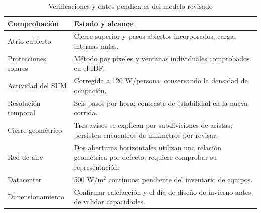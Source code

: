 \begin{table}[H]
\centering
\caption{Verificaciones y datos pendientes del modelo revisado}
\label{tab:db-verificacion}
{\small\singlespacing\renewcommand{\arraystretch}{1.10}
\begin{tabular}{p{3.7cm}p{9.3cm}}
\toprule
Comprobación & Estado y alcance \\
\midrule
Atrio cubierto & Cierre superior y pasos abiertos incorporados; cargas internas nulas. \\
Protecciones solares & Método por píxeles y ventanas individuales comprobados en el IDF. \\
Actividad del SUM & Corregida a 120 W/persona, conservando la densidad de ocupación. \\
Resolución temporal & Seis pasos por hora; contraste de estabilidad en la nueva corrida. \\
Cierre geométrico & Tres avisos se explican por subdivisiones de aristas; persisten encuentros de milímetros por revisar. \\
Red de aire & Dos aberturas horizontales utilizan una relación geométrica por defecto; requiere comprobar su representación. \\
Datacenter & 500 W/$\mathrm{m^2}$ continuos: pendiente del inventario de equipos. \\
Dimensionamiento & Confirmar calefacción y el día de diseño de invierno antes de validar capacidades. \\
\bottomrule
\end{tabular}}
\end{table}
